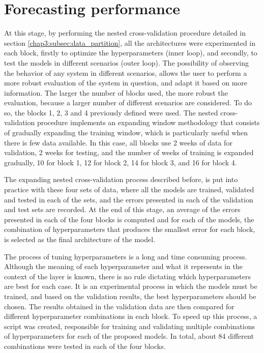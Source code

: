 \section{Forecasting performance}\label{chap3:section:stage_1}

At this stage, by performing the nested cross-validation procedure detailed in section \ref{chap3:subsec:data_partition}, all the architectures were experimented in each block, firstly to optimize the hyperparameters (inner loop), and secondly, to test the models in different scenarios (outer loop). The possibility of observing the behavior of any system in different scenarios, allows the user to perform a more robust evaluation of the system in question, and adapt it based on more information. The larger the number of blocks used, the more robust the evaluation, because a larger number of different scenarios are considered. To do so, the blocks 1, 2, 3 and 4 previously defined were used. The nested cross-validation procedure implements an expanding window methodology that consists of gradually expanding the training window, which is particularly useful when there is few data available. In this case, all blocks use 2 weeks of data for validation, 2 weeks for testing, and the number of weeks of training is expanded gradually, 10 for block 1, 12 for block 2, 14 for block 3, and 16 for block 4.

The expanding nested cross-validation process described before, is put into practice with these four sets of data, where all the models are trained, validated and tested in each of the sets, and the errors presented in each of the validation and test sets are recorded. At the end of this stage, an average of the errors presented in each of the four blocks is computed and for each of the models, the combination of hyperparameters that produces the smallest error for each block, is selected as the final architecture of the model. 

The process of tuning hyperparameters is a long and time consuming process. Although the meaning of each hyperparameter and what it represents in the context of the layer is known, there is no rule dictating which hyperparameters are best for each case. It is an experimental process in which the models must be trained, and based on the validation results, the best hyperparameters should be chosen. The results obtained in the validation data are then compared for different hyperparameter combinations in each block. To speed up this process, a script \cite{code} was created, responsible for training and validating multiple combinations of hyperparameters for each of the proposed models. In total, about 84 different combinations were tested in each of the four blocks.

